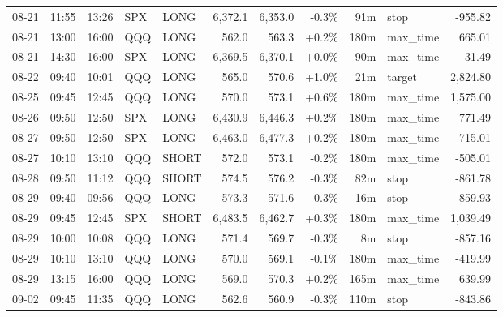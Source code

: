 \documentclass[11pt,a4paper,twoside]{article}
\begin{document}
\begin{center}
\begin{longtable}{>{\color{txtmain}}l l l l l r r r r >{\color{txtmain}}l r}
08-21 & 11:55 & 13:26 & SPX & LONG & 6,372.1 & 6,353.0 & \textcolor{lossred}{-0.3\%} & 91m & stop & \textcolor{lossred}{-955.82} \\
08-21 & 13:00 & 16:00 & QQQ & LONG & 562.0 & 563.3 & \textcolor{wingreen}{+0.2\%} & 180m & max\_time & \textcolor{wingreen}{665.01} \\
08-21 & 14:30 & 16:00 & SPX & LONG & 6,369.5 & 6,370.1 & \textcolor{wingreen}{+0.0\%} & 90m & max\_time & \textcolor{wingreen}{31.49} \\
08-22 & 09:40 & 10:01 & QQQ & LONG & 565.0 & 570.6 & \textcolor{wingreen}{+1.0\%} & 21m & target & \textcolor{wingreen}{2,824.80} \\
08-25 & 09:45 & 12:45 & QQQ & LONG & 570.0 & 573.1 & \textcolor{wingreen}{+0.6\%} & 180m & max\_time & \textcolor{wingreen}{1,575.00} \\
08-26 & 09:50 & 12:50 & SPX & LONG & 6,430.9 & 6,446.3 & \textcolor{wingreen}{+0.2\%} & 180m & max\_time & \textcolor{wingreen}{771.49} \\
08-27 & 09:50 & 12:50 & SPX & LONG & 6,463.0 & 6,477.3 & \textcolor{wingreen}{+0.2\%} & 180m & max\_time & \textcolor{wingreen}{715.01} \\
08-27 & 10:10 & 13:10 & QQQ & SHORT & 572.0 & 573.1 & \textcolor{lossred}{-0.2\%} & 180m & max\_time & \textcolor{lossred}{-505.01} \\
08-28 & 09:50 & 11:12 & QQQ & SHORT & 574.5 & 576.2 & \textcolor{lossred}{-0.3\%} & 82m & stop & \textcolor{lossred}{-861.78} \\
08-29 & 09:40 & 09:56 & QQQ & LONG & 573.3 & 571.6 & \textcolor{lossred}{-0.3\%} & 16m & stop & \textcolor{lossred}{-859.93} \\
08-29 & 09:45 & 12:45 & SPX & SHORT & 6,483.5 & 6,462.7 & \textcolor{wingreen}{+0.3\%} & 180m & max\_time & \textcolor{wingreen}{1,039.49} \\
08-29 & 10:00 & 10:08 & QQQ & LONG & 571.4 & 569.7 & \textcolor{lossred}{-0.3\%} & 8m & stop & \textcolor{lossred}{-857.16} \\
08-29 & 10:10 & 13:10 & QQQ & LONG & 570.0 & 569.1 & \textcolor{lossred}{-0.1\%} & 180m & max\_time & \textcolor{lossred}{-419.99} \\
08-29 & 13:15 & 16:00 & QQQ & LONG & 569.0 & 570.3 & \textcolor{wingreen}{+0.2\%} & 165m & max\_time & \textcolor{wingreen}{639.99} \\
09-02 & 09:45 & 11:35 & QQQ & LONG & 562.6 & 560.9 & \textcolor{lossred}{-0.3\%} & 110m & stop & \textcolor{lossred}{-843.86} \\

\end{longtable}
\end{center}
\end{document}
